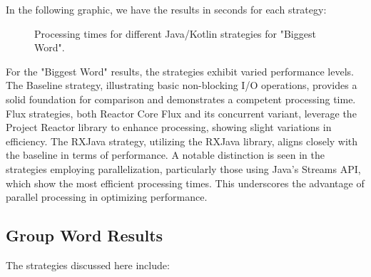 In the following graphic, we have the results in seconds for each strategy:

\begin{figure}[H]
    \centering
    \caption{Processing times for different Java/Kotlin strategies for "Biggest Word".}
    \label{fig:biggest_word_processing_times_java}
\end{figure}
    

    For the "Biggest Word" results, the strategies exhibit varied performance levels. The Baseline strategy, illustrating basic non-blocking I/O operations, provides a solid foundation for comparison and demonstrates a competent processing time. Flux strategies, both Reactor Core Flux and its concurrent variant, leverage the Project Reactor library to enhance processing, showing slight variations in efficiency. The RXJava strategy, utilizing the RXJava library, aligns closely with the baseline in terms of performance. A notable distinction is seen in the strategies employing parallelization, particularly those using Java's Streams API, which show the most efficient processing times. This underscores the advantage of parallel processing in optimizing performance.

    \clearpage

    \subsection{Group Word Results}
    \label{subsubsec:group_word_results}
    
   The strategies discussed here include:

